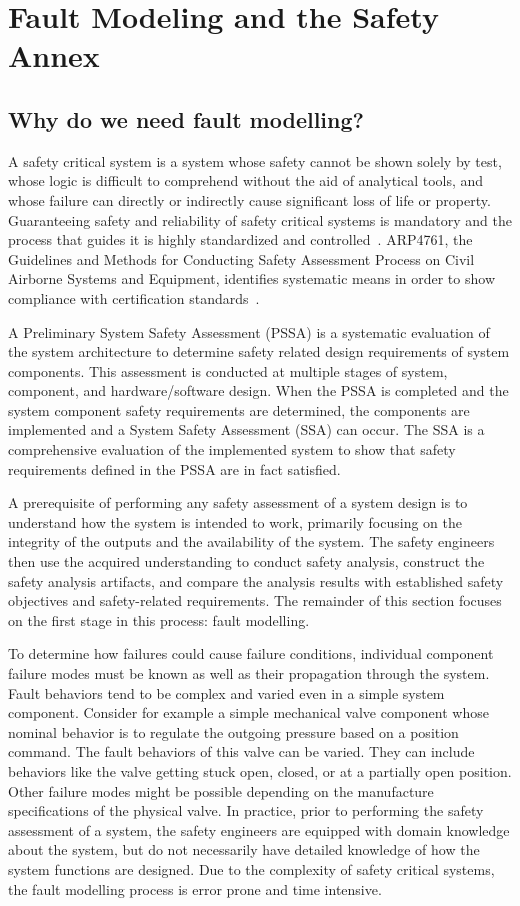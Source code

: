 \section{Fault Modeling and the Safety Annex}
\label{sec:fault_modeling}

\subsection{Why do we need fault modelling?}
 A safety critical system is a system whose safety cannot be shown solely by test, whose logic is difficult to comprehend without the aid of analytical tools, and whose failure can directly or indirectly cause significant loss of life or property. Guaranteeing safety and reliability of safety critical systems is mandatory and the process that guides it is highly standardized and controlled~\cite{RTCA:StdC,SAE:ARP4761}. ARP4761, the Guidelines and Methods for Conducting Safety Assessment Process on Civil Airborne Systems and Equipment,  identifies systematic means in order to show compliance with certification standards~\cite{SAE:ARP4761}.

A Preliminary System Safety Assessment (PSSA) is a systematic evaluation of the system architecture to determine safety related design requirements of system components. This assessment is conducted at multiple stages of system, component, and hardware/software design. When the PSSA is completed and the system component safety requirements are determined, the components are implemented and a System Safety Assessment (SSA) can occur. The SSA is a comprehensive evaluation of the implemented system to show that safety requirements defined in the PSSA are in fact satisfied. 

A prerequisite of performing any safety assessment of a system design is to understand how the system is intended to work, primarily focusing on the integrity of the outputs and the availability of the system. The safety engineers then use the acquired understanding to conduct safety analysis, construct the safety analysis artifacts, and compare the analysis results with established safety objectives and safety-related requirements. The remainder of this section focuses on the first stage in this process: fault modelling. 

To determine how failures could cause failure conditions, individual component failure modes must be known as well as their propagation through the system. Fault behaviors tend to be complex and varied even in a simple system component. Consider for example a simple mechanical valve component whose nominal behavior is to regulate the outgoing pressure based on a position command. The fault behaviors of this valve can be varied. They can include behaviors like the valve getting stuck open, closed, or at a partially open position. Other failure modes might be possible depending on the manufacture specifications of the physical valve. In practice, prior to performing the safety assessment of a system, the safety engineers are equipped with domain knowledge about the system, but do not necessarily have detailed knowledge of how the system functions are designed. Due to the complexity of safety critical systems, the fault modelling process is error prone and time intensive.

